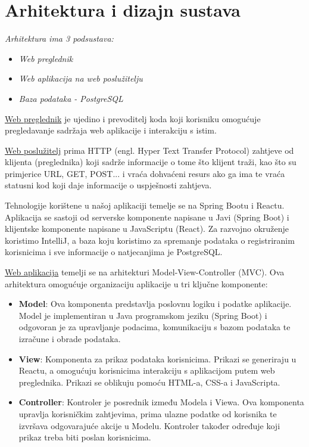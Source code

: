 \chapter{Arhitektura i dizajn sustava}

		\textit{ Arhitektura ima 3 podsustava:}
	\begin{itemize}
		\item 	\textit{Web preglednik}
		\item 	\textit{Web aplikacija na web poslužitelju}
		\item 	\textit{Baza podataka - PostgreSQL }		
	\end{itemize}


{\underline{Web preglednik} je ujedino i prevoditelj koda koji korisniku omogućuje pregledavanje sadržaja web aplikacije i interakciju s istim.}

{\underline{Web poslužitelj} prima HTTP (engl. Hyper
Text Transfer Protocol) zahtjeve od klijenta (preglednika) koji sadrže informacije o tome što klijent traži, kao što su primjerice URL, GET, POST... i vraća dohvaćeni resurs ako ga ima te vraća statusni kod koji daje informacije o uspješnosti zahtjeva.}

{Tehnologije korištene u našoj aplikaciji temelje se na Spring Bootu i Reactu. Aplikacija se sastoji od serverske komponente napisane u Javi (Spring Boot) i klijentske komponente napisane u JavaScriptu (React). Za razvojno okruženje koristimo IntelliJ, a baza koju koristimo za spremanje podataka o registriranim korisnicima i sve informacije o natjecanjima je PostgreSQL.}

{\underline{Web aplikacija} temelji se na arhitekturi Model-View-Controller (MVC). Ova arhitektura omogućuje organizaciju aplikacije u tri ključne komponente:}

\begin{itemize}
    \item \textbf{Model}: Ova komponenta predstavlja poslovnu logiku i podatke aplikacije. Model je implementiran u Java programskom jeziku (Spring Boot) i odgovoran je za upravljanje podacima, komunikaciju s bazom podataka te izračune i obrade podataka.
    
    \item \textbf{View}: Komponenta za prikaz podataka korisnicima. Prikazi se generiraju u Reactu, a omogućuju korisnicima interakciju s aplikacijom putem web preglednika. Prikazi se oblikuju pomoću HTML-a, CSS-a i JavaScripta.
    
    \item \textbf{Controller}: Kontroler je posrednik između Modela i Viewa. Ova komponenta upravlja korisničkim zahtjevima, prima ulazne podatke od korisnika te izvršava odgovarajuće akcije u Modelu. Kontroler također određuje koji prikaz treba biti poslan korisnicima.\\
\end{itemize}	

